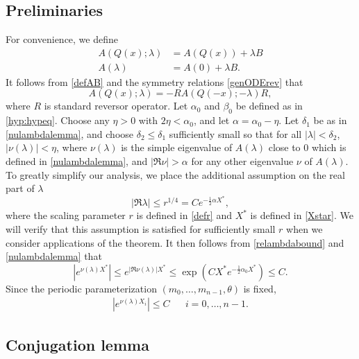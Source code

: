 \documentclass[12pt]{elsarticle}
\theoremstyle{plain}
\theoremstyle{definition}
\theoremstyle{remark}
\numberwithin{theorem}{section}
\numberwithin{equation}{section}
\begin{document}
\subsection{Preliminaries}

For convenience, we define
\begin{equation}
\begin{aligned}
A(Q(x); \lambda) &= A(Q(x)) + \lambda B \\
A(\lambda) &= A(0) + \lambda B.
\end{aligned}
\end{equation}
It follows from \cref{defAB} and the symmetry relations \cref{genODErev} that 
\begin{equation}\label{AQsymmetry}
A(Q(x); \lambda) = -R A(Q(-x); -\lambda)R,
\end{equation}
where $R$ is standard reversor operator. Let $\alpha_0$ and $\beta_0$ be defined as in \cref{hyp:hypeq}. Choose any $\eta > 0$ with $2 \eta < \alpha_0$, and let $\alpha = \alpha_0 - \eta$. Let $\delta_1$ be as in \cref{nulambdalemma}, and choose $\delta_2 \leq \delta_1$ sufficiently small so that for all $|\lambda| < \delta_2$, $|\nu(\lambda)| < \eta$, where $\nu(\lambda)$ is the simple eigenvalue of $A(\lambda)$ close to 0 which is defined in \cref{nulambdalemma}, and $|\Re \nu| > \alpha$ for any other eigenvalue $\nu$ of $A(\lambda)$. To greatly simplify our analysis, we place the additional assumption on the real part of $\lambda$
\begin{equation}\label{relambdabound}
|\Re \lambda| \leq r^{1/4} = C e^{-\frac{1}{2}\alpha X^*},
\end{equation}
where the scaling parameter $r$ is defined in \cref{defr} and $X^*$ is defined in \cref{Xstar}. We will verify that this assumption is satisfied for sufficiently small $r$ when we consider applications of the theorem. It then follows from \cref{relambdabound} and \cref{nulambdalemma} that 
\begin{equation}
|e^{\nu(\lambda)X^*}| \leq e^{|\Re \nu(\lambda)| X^*} \leq \exp \left( C X^* e^{-\frac{1}{2} \alpha_0 X^* } \right) \leq C.
\end{equation}
Since the periodic parameterization $(m_0, \dots, m_{n-1}, \theta)$ is fixed,
\begin{align}\label{expnubound}
|e^{\nu(\lambda)X_i}| \leq C  && i = 0, \dots, n-1.
\end{align}

\subsection{Conjugation lemma}
\end{document}
